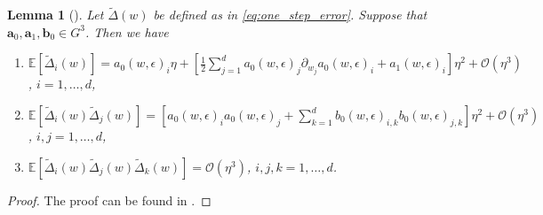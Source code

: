 \documentclass[12pt]{article}
\newtheorem{lemma}[lemma]{Lemma}
\theoremstyle{definition}
\numberwithin{equation}{section}
\newcommand{\ev}[1]{\mathbb{E}\left[{#1}\right]}
\begin{document}
\begin{lemma}[]
  \label{lem:sde_one_step}
  Let $ \widetilde{\Delta}(w)$ be defined as in \eqref{eq:one_step_error}. Suppose that $\mathbf{a}_0, \mathbf{a}_1, \mathbf{b}_0 \in G^3$. Then we have
  \begin{enumerate}[label=(\roman*)]
    \item  $\ev{\widetilde{\Delta}_{i}(w)} = a_{0}(w,\epsilon)_{i}\eta + \left[\frac{1}{2}\sum_{j=1}^d a_{0}(w,\epsilon)_{j}\partial_{w_j}a_0(w,\epsilon)_{i} + a_1(w,\epsilon)_{i}\right] \eta^2 + \mathcal{O}(\eta^3)$, $i= 1,\dots,d$,
    \item $\ev{\widetilde{\Delta}_{i}(w)\widetilde{\Delta}_{j}(w)} = \left[a_0(w, \epsilon)_{i}a_0(w,\epsilon)_{j} + \sum_{k=1}^db_0(w, \epsilon)_{i,k}b_0(w,\epsilon)_{j,k}\right]\eta^2 + \mathcal{O}(\eta^3)$, $i,j=1,\dots,d$,
    \item $\ev{\widetilde{\Delta}_{i}(w)\widetilde{\Delta}_{j}(w)\widetilde{\Delta}_{k}(w)} = \mathcal{O}(\eta^3)$, $i,j,k = 1,\dots, d$.
  \end{enumerate}
\end{lemma}
\begin{proof}
  The proof can be found in \cite[Lemma 4]{liStochasticModifiedEquations2019}.
\end{proof}
\end{document}
